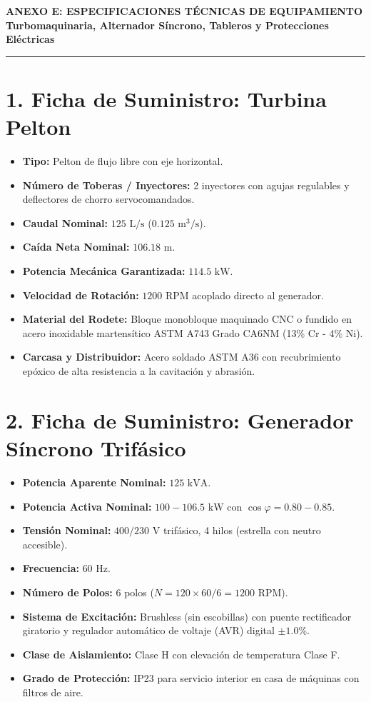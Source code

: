 \documentclass[11pt,a4paper]{article}
\begin{document}
\begin{center}
    {\LARGE\bfseries\textcolor{navyblue}{ANEXO E: ESPECIFICACIONES TÉCNICAS DE EQUIPAMIENTO}}\\[0.6em]
    {\large\bfseries Turbomaquinaria, Alternador Síncrono, Tableros y Protecciones Eléctricas}\\[1.2em]
    \rule{\linewidth}{1.2pt}
\end{center}


\section*{1. Ficha de Suministro: Turbina Pelton}
\begin{itemize}
    \item \textbf{Tipo:} Pelton de flujo libre con eje horizontal.
    \item \textbf{Número de Toberas / Inyectores:} 2 inyectores con agujas regulables y deflectores de chorro servocomandados.
    \item \textbf{Caudal Nominal:} $125\text{ L/s}$ ($0.125\text{ m}^3/\text{s}$).
    \item \textbf{Caída Neta Nominal:} $106.18\text{ m}$.
    \item \textbf{Potencia Mecánica Garantizada:} $114.5\text{ kW}$.
    \item \textbf{Velocidad de Rotación:} $1200\text{ RPM}$ acoplado directo al generador.
    \item \textbf{Material del Rodete:} Bloque monobloque maquinado CNC o fundido en acero inoxidable martensítico ASTM A743 Grado CA6NM (13\% Cr - 4\% Ni).
    \item \textbf{Carcasa y Distribuidor:} Acero soldado ASTM A36 con recubrimiento epóxico de alta resistencia a la cavitación y abrasión.
\end{itemize}

\section*{2. Ficha de Suministro: Generador Síncrono Trifásico}
\begin{itemize}
    \item \textbf{Potencia Aparente Nominal:} $125\text{ kVA}$.
    \item \textbf{Potencia Activa Nominal:} $100 - 106.5\text{ kW}$ con $\cos\varphi = 0.80 - 0.85$.
    \item \textbf{Tensión Nominal:} $400 / 230\text{ V}$ trifásico, 4 hilos (estrella con neutro accesible).
    \item \textbf{Frecuencia:} $60\text{ Hz}$.
    \item \textbf{Número de Polos:} 6 polos ($N = 120 \times 60 / 6 = 1200\text{ RPM}$).
    \item \textbf{Sistema de Excitación:} Brushless (sin escobillas) con puente rectificador giratorio y regulador automático de voltaje (AVR) digital $\pm 1.0\%$.
    \item \textbf{Clase de Aislamiento:} Clase H con elevación de temperatura Clase F.
    \item \textbf{Grado de Protección:} IP23 para servicio interior en casa de máquinas con filtros de aire.
\end{itemize}
\end{document}
